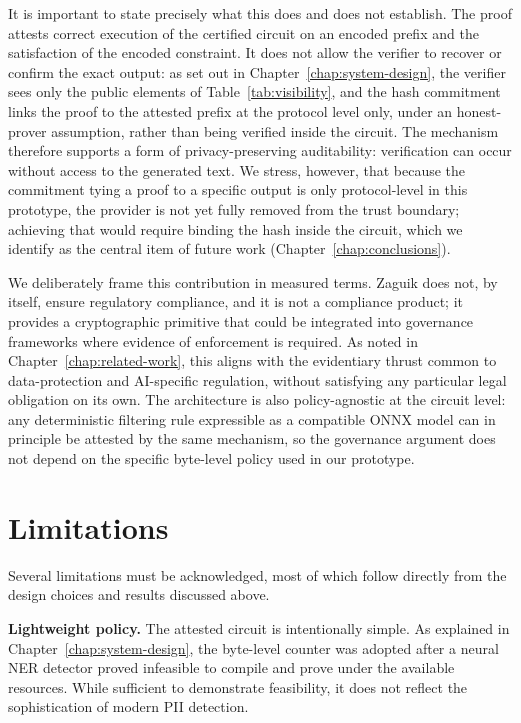 \medskip

It is important to state precisely what this does and does not establish. The proof attests correct execution of the certified circuit on an encoded prefix and the satisfaction of the encoded constraint. It does not allow the verifier to recover or confirm the exact output: as set out in Chapter~\ref{chap:system-design}, the verifier sees only the public elements of Table~\ref{tab:visibility}, and the hash commitment links the proof to the attested prefix at the protocol level only, under an honest-prover assumption, rather than being verified inside the circuit. The mechanism therefore supports a form of privacy-preserving auditability: verification can occur without access to the generated text. We stress, however, that because the commitment tying a proof to a specific output is only protocol-level in this prototype, the provider is not yet fully removed from the trust boundary; achieving that would require binding the hash inside the circuit, which we identify as the central item of future work (Chapter~\ref{chap:conclusions}).

\medskip

We deliberately frame this contribution in measured terms. Zaguik does not, by itself, ensure regulatory compliance, and it is not a compliance product; it provides a cryptographic primitive that could be integrated into governance frameworks where evidence of enforcement is required. As noted in Chapter~\ref{chap:related-work}, this aligns with the evidentiary thrust common to data-protection and AI-specific regulation, without satisfying any particular legal obligation on its own. The architecture is also policy-agnostic at the circuit level: any deterministic filtering rule expressible as a compatible ONNX model can in principle be attested by the same mechanism, so the governance argument does not depend on the specific byte-level policy used in our prototype.

\section{Limitations}
\label{sec:disc-limitations}

Several limitations must be acknowledged, most of which follow directly from the design choices and results discussed above.

\medskip

\textbf{Lightweight policy.} The attested circuit is intentionally simple. As explained in Chapter~\ref{chap:system-design}, the byte-level counter was adopted after a neural NER detector proved infeasible to compile and prove under the available resources. While sufficient to demonstrate feasibility, it does not reflect the sophistication of modern PII detection.

